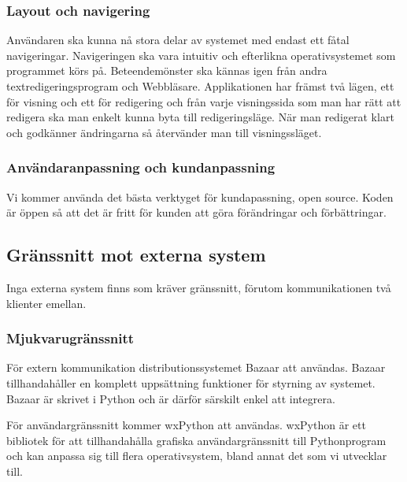 \subsubsection{Layout och navigering}
Användaren ska kunna nå stora delar av systemet med endast ett fåtal navigeringar. Navigeringen ska vara intuitiv och efterlikna operativsystemet som programmet körs på. Beteendemönster ska kännas igen från andra textredigeringsprogram och Webbläsare. Applikationen har främst två lägen, ett för visning och ett för redigering och från varje visningssida som man har rätt att redigera ska man enkelt kunna byta till redigeringsläge. När man redigerat klart och godkänner ändringarna så återvänder man till visningssläget.


\subsubsection{Användaranpassning och kundanpassning}
Vi kommer använda det bästa verktyget för kundapassning, open source. Koden är öppen så att det är fritt för kunden att göra förändringar och förbättringar.

\subsection{Gränssnitt mot externa system}
Inga externa system finns som kräver gränssnitt, förutom kommunikationen två klienter emellan.

\subsubsection{Mjukvarugränssnitt}
För extern kommunikation distributionssystemet Bazaar att användas. Bazaar tillhandahåller en komplett uppsättning funktioner för styrning av systemet. Bazaar är skrivet i Python och är därför särskilt enkel att integrera.

För användargränssnitt kommer wxPython att användas. wxPython är ett bibliotek för att tillhandahålla grafiska användargränssnitt till Pythonprogram och kan anpassa sig till flera operativsystem, bland annat det som vi utvecklar till.


